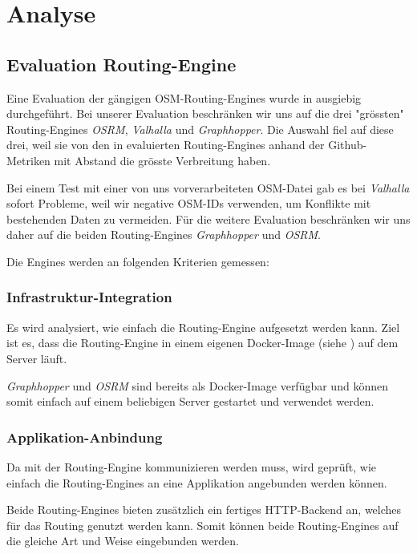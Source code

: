 \section{Analyse}
\label{sec:Analyse}

\subsection{Evaluation Routing-Engine}
\label{analyse:Evaluation Routing-Engine}
Eine Evaluation der gängigen \ac{OSM}-Routing-Engines wurde in \cite{eval_routing_engine} ausgiebig durchgeführt. Bei unserer Evaluation beschränken wir uns auf die drei "grössten" Routing-Engines \emph{OSRM}\cite{osrm}, \emph{Valhalla}\cite{valhalla} und \emph{Graphhopper}\cite{graphhopper}. Die Auswahl fiel auf diese drei, weil sie von den in \cite{eval_routing_engine} evaluierten Routing-Engines anhand der Github-Metriken mit Abstand die grösste Verbreitung haben.

Bei einem Test mit einer von uns vorverarbeiteten \ac{OSM}-Datei gab es bei \emph{Valhalla} sofort Probleme, weil wir negative \ac{OSM}-IDs verwenden, um Konflikte mit bestehenden Daten zu vermeiden. Für die weitere Evaluation beschränken wir uns daher auf die beiden Routing-Engines \emph{Graphhopper} und \emph{OSRM}.

Die Engines werden an folgenden Kriterien gemessen:

\subsubsection{Infrastruktur-Integration}
\label{analyse:Infrastruktur-Integration}
Es wird analysiert, wie einfach die Routing-Engine aufgesetzt werden kann. Ziel ist es, dass die Routing-Engine in einem eigenen Docker-Image (siehe ) auf dem Server läuft.

\emph{Graphhopper} und \emph{OSRM} sind bereits als Docker-Image verfügbar und können somit einfach auf einem beliebigen Server gestartet und verwendet werden.


\subsubsection{Applikation-Anbindung}
\label{analyse:Applikation-Anbindung}
Da mit der Routing-Engine kommunizieren werden muss, wird geprüft, wie einfach die Routing-Engines an eine Applikation angebunden werden können.

Beide Routing-Engines bieten zusätzlich ein fertiges HTTP-Backend an, welches für das Routing genutzt werden kann. Somit können beide Routing-Engines auf die gleiche Art und Weise eingebunden werden.

